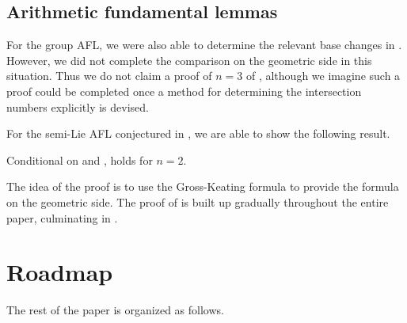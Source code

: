 \subsection{Arithmetic fundamental lemmas}
For the group AFL, we were also able to determine the
relevant base changes in .
However, we did not complete the comparison on the geometric side in this situation.
Thus we do not claim a proof of $n = 3$ of ,
although we imagine such a proof could be completed
once a method for determining the intersection numbers explicitly is devised.

For the semi-Lie AFL conjectured in ,
we are able to show the following result.
\begin{theorem}
  \label{thm:semi_lie_n_equals_2}
  Conditional on  and ,
   holds for $n = 2$.
\end{theorem}
The idea of the proof is to use the Gross-Keating formula \cite{ref:GK}
to provide the formula on the geometric side.
The proof of  is built up gradually
throughout the entire paper, culminating in .

\section{Roadmap}
The rest of the paper is organized as follows.

